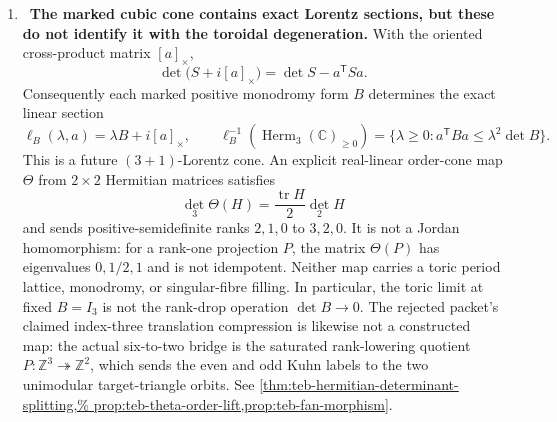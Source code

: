 \begin{enumerate}[leftmargin=1.8em,itemsep=.65em]
The candidate inverse-dual matrix and the positive Gram momentum are also
separated by an exact invariant:
\[
 \det G_{\eta,T}=-\frac23D_T<0,
 \qquad
 \operatorname{im}p_\alpha=
 \operatorname{Herm}_2(\mathbb C)_{\geq0}.
\]
Neither positive rescaling nor complex congruence can identify their inertia
types; a further morphism is required.  After a separate length/time
dictionary is supplied, the same affine host supports the ordinary
Klein--Gordon theory.  Its Fock Hamiltonian has excitation gap exactly
\(m_{\mathrm{KG}}\) for \(m_{\mathrm{KG}}>0\) and gap zero for
\(m_{\mathrm{KG}}=0\).  On a periodic spatial gauge regulator, the massless
transverse Gaussian frequency is \(2\pi/L\to0\).  Explicit countermodels also
show that entanglement occurs in both gapped and gapless systems.  A positive
auxiliary gap transfers to the physical Hamiltonian only through a map on the
entire excitation form domain satisfying
\[
 \|Ru\|\geq c_R\|u\|,\qquad
 \mathfrak b[Ru]\leq C_R
 (\mathfrak a_{\rm phys}[u]-E_{\rm vac}\|u\|^2),
\]
in which case
\(\operatorname{gap}(A_{\rm phys})\geq\gamma c_R^2/C_R\).
An intertwiner on a single gapped subspace is not enough.  See
\cref{hnsp-lorentz-theorem,hnsp-spin-theorem,%
hnsp-intrinsic-compact-representation,hnsp-intrinsic-gauge-scalar-theorem,%
hnsp-centre-screening-corollary,hnsp-candidate-spacelike,%
hnsp-determinant-orbit-geometry,hnsp-free-field-gap,%
hnsp-gauge-gaussian-gap,hnsp-coercive-transfer}.

\item \Verified\ \textbf{The marked cubic cone contains exact Lorentz
sections, but these do not identify it with the toroidal degeneration.}
With the oriented cross-product matrix \([a]_{\times}\),
\[
 \det\bigl(S+i[a]_{\times}\bigr)=\det S-a^{\mathsf T}Sa.
\]
Consequently each marked positive monodromy form \(B\) determines the exact
linear section
\[
 \ell_B(\lambda,a)=\lambda B+i[a]_{\times},\qquad
 \ell_B^{-1}\!\left(\operatorname{Herm}_3(\mathbb C)_{\geq0}\right)
 =\{\lambda\geq0:a^{\mathsf T}Ba\leq\lambda^2\det B\}.
\]
This is a future \((3+1)\)-Lorentz cone.  An explicit real-linear order-cone
map \(\Theta\) from \(2\times2\) Hermitian matrices satisfies
\[
 \det_3\Theta(H)=\frac{\operatorname{tr}H}{2}\det_2H
\]
and sends positive-semidefinite ranks \(2,1,0\) to \(3,2,0\).  It is not a
Jordan homomorphism: for a rank-one projection \(P\), the matrix
\(\Theta(P)\) has eigenvalues \(0,1/2,1\) and is not idempotent.  Neither map carries a toric period lattice, monodromy, or
singular-fibre filling.  In particular, the toric limit at fixed \(B=I_3\)
 is not the rank-drop operation \(\det B\to0\).  The rejected packet's claimed
index-three translation compression is likewise not a constructed map: the
actual six-to-two bridge is the saturated rank-lowering quotient
\(P:\mathbb Z^3\twoheadrightarrow\mathbb Z^2\), which sends the even and odd
Kuhn labels to the two unimodular target-triangle orbits.  See
\cref{thm:teb-hermitian-determinant-splitting,%
prop:teb-theta-order-lift,prop:teb-fan-morphism}.


\end{enumerate}
